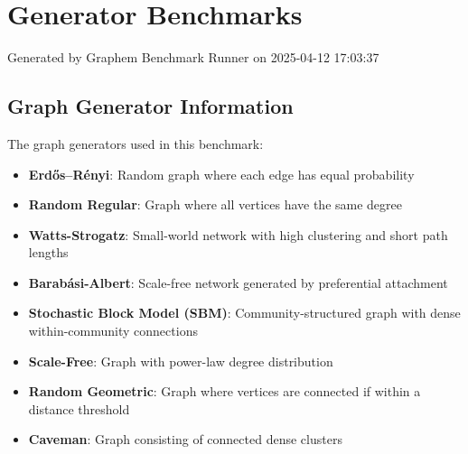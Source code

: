 \documentclass{article}
\begin{document}
\section*{Generator Benchmarks}
Generated by Graphem Benchmark Runner on 2025-04-12 17:03:37
\subsection*{Graph Generator Information}
The graph generators used in this benchmark:
\begin{itemize}
\item \textbf{Erdős–Rényi}: Random graph where each edge has equal probability
\item \textbf{Random Regular}: Graph where all vertices have the same degree
\item \textbf{Watts-Strogatz}: Small-world network with high clustering and short path lengths
\item \textbf{Barabási-Albert}: Scale-free network generated by preferential attachment
\item \textbf{Stochastic Block Model (SBM)}: Community-structured graph with dense within-community connections
\item \textbf{Scale-Free}: Graph with power-law degree distribution
\item \textbf{Random Geometric}: Graph where vertices are connected if within a distance threshold
\item \textbf{Caveman}: Graph consisting of connected dense clusters
\end{itemize}
\end{document}

